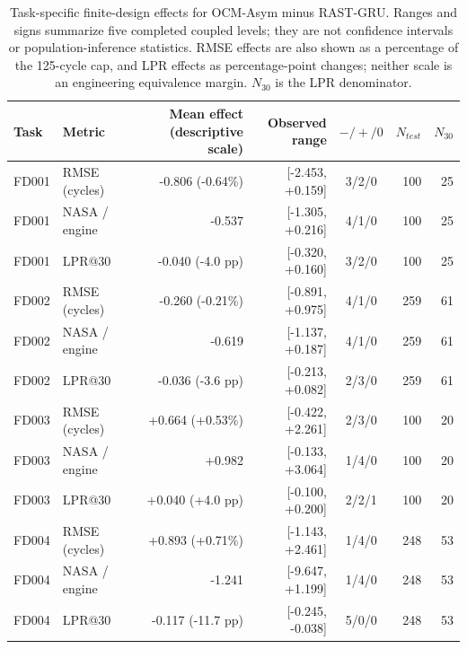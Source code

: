 \begin{table}[!t]
\centering
\small
\setlength{\tabcolsep}{4.5pt}
\caption{Task-specific finite-design effects for OCM-Asym minus RAST-GRU. Ranges and signs summarize five completed coupled levels; they are not confidence intervals or population-inference statistics. RMSE effects are also shown as a percentage of the 125-cycle cap, and LPR effects as percentage-point changes; neither scale is an engineering equivalence margin. $N_{30}$ is the LPR denominator.}
\label{tab:primary-effects-only}
\begin{tabular}{llrrcrr}
\toprule
Task & Metric & Mean effect (descriptive scale) & Observed range & $-/+/0$ & $N_{test}$ & $N_{30}$ \\
\midrule
FD001 & RMSE (cycles) & -0.806 (-0.64\%) & [-2.453, +0.159] & 3/2/0 & 100 & 25 \\
FD001 & NASA / engine & -0.537 & [-1.305, +0.216] & 4/1/0 & 100 & 25 \\
FD001 & LPR@30 & -0.040 (-4.0 pp) & [-0.320, +0.160] & 3/2/0 & 100 & 25 \\
FD002 & RMSE (cycles) & -0.260 (-0.21\%) & [-0.891, +0.975] & 4/1/0 & 259 & 61 \\
FD002 & NASA / engine & -0.619 & [-1.137, +0.187] & 4/1/0 & 259 & 61 \\
FD002 & LPR@30 & -0.036 (-3.6 pp) & [-0.213, +0.082] & 2/3/0 & 259 & 61 \\
FD003 & RMSE (cycles) & +0.664 (+0.53\%) & [-0.422, +2.261] & 2/3/0 & 100 & 20 \\
FD003 & NASA / engine & +0.982 & [-0.133, +3.064] & 1/4/0 & 100 & 20 \\
FD003 & LPR@30 & +0.040 (+4.0 pp) & [-0.100, +0.200] & 2/2/1 & 100 & 20 \\
FD004 & RMSE (cycles) & +0.893 (+0.71\%) & [-1.143, +2.461] & 1/4/0 & 248 & 53 \\
FD004 & NASA / engine & -1.241 & [-9.647, +1.199] & 1/4/0 & 248 & 53 \\
FD004 & LPR@30 & -0.117 (-11.7 pp) & [-0.245, -0.038] & 5/0/0 & 248 & 53 \\
\bottomrule
\end{tabular}
\end{table}
